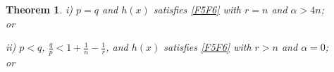 \documentclass[12pt]{amsart}
\newtheorem{theorem}{Theorem}[section]
\theoremstyle{definition}
\numberwithin{equation}{section}
\numberwithin{equation}{section}
\begin{document}
{\begin{theorem}
    { i)} $p=q$ and
 $h(x)$ satisfies \eqref{F5F6}  with $r=n$ and $\alpha>4n$;\\ 
 or
 
 { ii)}  $p<q$,  $\displaystyle \frac{q}{p} < 1+\frac{1}{n}-\frac{1}{r}$, and $h(x)$ satisfies \eqref{F5F6} with $r>n$ and $\alpha=0$; 
\\
or


\end{theorem}}
\end{document}
